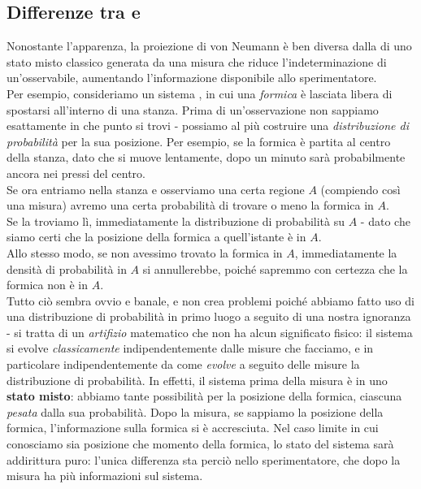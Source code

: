 \documentclass[../../FisicaTeorica.tex]{subfiles}
\begin{document}
\subsection{Differenze tra \MC e \MQ} 
Nonostante l'apparenza, la proiezione di von Neumann è ben diversa dalla  di uno stato misto classico generata da una misura che riduce  l'indeterminazione di un'osservabile, aumentando l'informazione disponibile allo sperimentatore.\\
Per esempio, consideriamo un sistema , in cui una \textit{formica} è lasciata libera di spostarsi all'interno di una stanza. Prima di un'osservazione non sappiamo esattamente in che punto si trovi - possiamo al più costruire una \textit{distribuzione di probabilità} per la sua posizione. Per esempio, se la formica è partita al centro della stanza, dato che si muove lentamente, dopo un minuto sarà probabilmente ancora nei pressi del centro.\\
Se ora entriamo nella stanza e osserviamo una certa regione $A$ (compiendo così una misura) avremo una certa probabilità di trovare o meno la formica in $A$.\\
Se la troviamo lì, immediatamente la distribuzione di probabilità  su $A$ - dato che siamo certi che la posizione della formica a quell'istante è in $A$.\\
Allo stesso modo, se non avessimo trovato la formica in $A$, immediatamente la densità di probabilità in $A$ si annullerebbe, poiché sapremmo con certezza che la formica non è in $A$.\\
Tutto ciò sembra ovvio e banale, e non crea problemi poiché abbiamo fatto uso di una distribuzione di probabilità in primo luogo a seguito di una nostra ignoranza - si tratta di un \textit{artifizio} matematico che non ha alcun significato fisico: il sistema si evolve \textit{classicamente} indipendentemente dalle misure che facciamo, e in particolare indipendentemente da come \textit{evolve} a seguito delle misure la distribuzione di probabilità. In effetti, il sistema prima della misura è in uno \textbf{stato misto}: abbiamo tante possibilità per la posizione della formica, ciascuna \textit{pesata} dalla sua probabilità. Dopo la misura, se sappiamo la posizione della formica, l'informazione sulla formica si è accresciuta. Nel caso limite in cui conosciamo sia posizione che momento della formica, lo stato del sistema sarà addirittura puro: l'unica differenza sta perciò nello sperimentatore, che dopo la misura ha più informazioni sul sistema.\\
\end{document}
